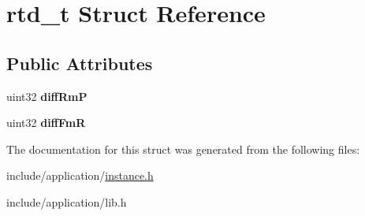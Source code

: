 \hypertarget{structrtd__t}{\section{rtd\-\_\-t Struct Reference}
\label{structrtd__t}
}
\subsection*{Public Attributes}
\begin{DoxyCompactItemize}
\item 
\hypertarget{structrtd__t_ae20e67a0b21ad5843770229932b831c0}{uint32 {\bfseries diff\-Rm\-P}}\label{structrtd__t_ae20e67a0b21ad5843770229932b831c0}

\item 
\hypertarget{structrtd__t_a36c92abae5be78788f817793807d9d5e}{uint32 {\bfseries diff\-Fm\-R}}\label{structrtd__t_a36c92abae5be78788f817793807d9d5e}

\end{DoxyCompactItemize}


The documentation for this struct was generated from the following files\-:\begin{DoxyCompactItemize}
\item 
include/application/\hyperlink{instance_8h}{instance.\-h}\item 
include/application/lib.\-h\end{DoxyCompactItemize}

